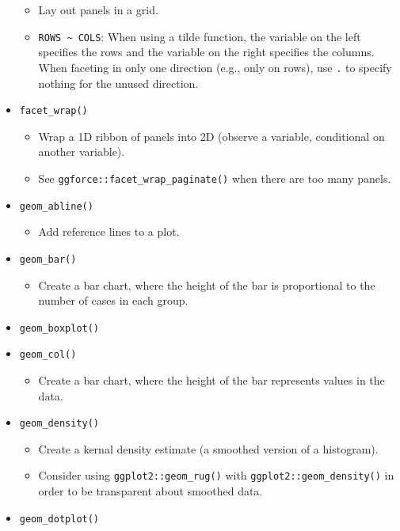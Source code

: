\documentclass[
]{book}
\providecommand{\tightlist}{%
  \setlength{\itemsep}{0pt}\setlength{\parskip}{0pt}}
\begin{document}
\begin{itemize}
  \begin{itemize}
  \tightlist
  \item
    Lay out panels in a grid.
  \item
    \texttt{ROWS\ \textasciitilde{}\ COLS}: When using a tilde function, the variable on the left specifies the rows and the variable on the right specifies the columns. When faceting in only one direction (e.g., only on rows), use \texttt{.} to specify nothing for the unused direction.
  \end{itemize}
\item
  \texttt{facet\_wrap()}

  \begin{itemize}
  \tightlist
  \item
    Wrap a 1D ribbon of panels into 2D (observe a variable, conditional on another variable).
  \item
    See \texttt{ggforce::facet\_wrap\_paginate()} when there are too many panels.
  \end{itemize}
\item
  \texttt{geom\_abline()}

  \begin{itemize}
  \tightlist
  \item
    Add reference lines to a plot.
  \end{itemize}
\item
  \texttt{geom\_bar()}

  \begin{itemize}
  \tightlist
  \item
    Create a bar chart, where the height of the bar is proportional to the number of cases in each group.
  \end{itemize}
\item
  \texttt{geom\_boxplot()}
\item
  \texttt{geom\_col()}

  \begin{itemize}
  \tightlist
  \item
    Create a bar chart, where the height of the bar represents values in the data.
  \end{itemize}
\item
  \texttt{geom\_density()}

  \begin{itemize}
  \tightlist
  \item
    Create a kernal density estimate (a smoothed version of a histogram).
  \item
    Consider using \texttt{ggplot2::geom\_rug()} with \texttt{ggplot2::geom\_density()} in order to be transparent about smoothed data.
  \end{itemize}
\item
  \texttt{geom\_dotplot()}


\end{itemize}
\end{document}
